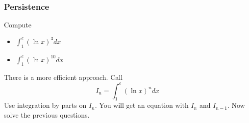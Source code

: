 \documentclass[14pt]{beamer}
\begin{document}
\begin{frame}[t]
	\frametitle{Persistence}
	Compute
	\begin{multicols}{2}
		\begin{itemize}
			\item $\displaystyle \int_{1}^{e}\left( \ln x \right)^{3}dx$
				\vspace{.2cm}

			\item $\displaystyle \int_{1}^{e}\left( \ln x \right)^{10}dx$
		\end{itemize}
	\end{multicols}
	There is a more efficient approach. Call
	\[
		I_{n}= \int_{1}^{e}\left( \ln x \right)^{n}dx
	\]
	Use integration by parts on $I_{n}$. You will get an equation with $I_{n}$ and
	$I_{n-1}$. Now solve the previous questions.

	\vfill
	\hfill \href{https://oeis.org/}{}
\end{frame}
\end{document}
